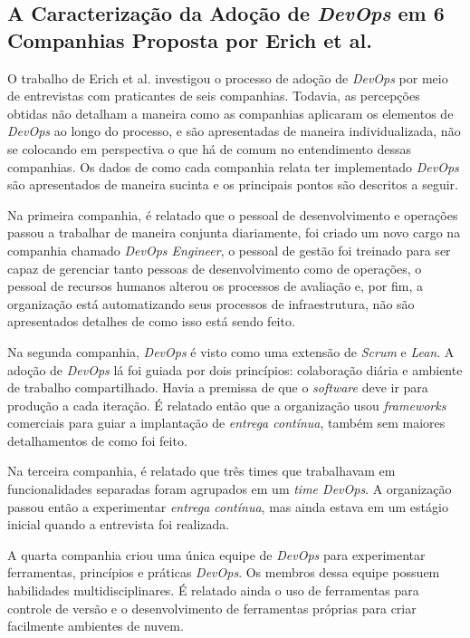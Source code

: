 {\subsection{A Caracterização da Adoção de {\it DevOps} em 6 Companhias Proposta por Erich et al. \cite{qualitative_devops_journalsw_17}}

O trabalho de Erich et al. \cite{qualitative_devops_journalsw_17} investigou
o processo de adoção de \textit{DevOps} por meio de entrevistas com praticantes
de seis companhias. Todavia, as percepções obtidas não detalham a maneira como
as companhias aplicaram os elementos de \textit{DevOps} ao longo do processo,
e são apresentadas de maneira individualizada, não se colocando em perspectiva
o que há de comum no entendimento dessas companhias. Os dados de como cada
companhia relata ter implementado \textit{DevOps} são apresentados de maneira
sucinta e os principais pontos são descritos a seguir.

Na primeira companhia, é relatado que o pessoal de desenvolvimento e
operações passou a trabalhar de maneira conjunta diariamente, foi criado um
novo cargo na companhia chamado \textit{DevOps Engineer}, o pessoal de gestão
foi treinado para ser capaz de gerenciar tanto pessoas de desenvolvimento como
de operações, o pessoal de recursos humanos alterou os processos de avaliação e,
por fim, a organização está automatizando seus processos de infraestrutura, não
são apresentados detalhes de como isso está sendo feito.

Na segunda companhia, \textit{DevOps} é visto como uma extensão de
\textit{Scrum} e \textit{Lean}. A adoção de \textit{DevOps} lá foi guiada por
dois princípios: colaboração diária e ambiente de trabalho compartilhado.
Havia a premissa de que o \textit{software} deve ir para produção a cada
iteração. É relatado então que a organização usou \textit{frameworks}
comerciais para guiar a implantação de \emph{entrega contínua}, também sem maiores
detalhamentos de como foi feito.

Na terceira companhia, é relatado que três times que trabalhavam em
funcionalidades separadas foram agrupados em um \emph{time DevOps}. A organização
passou então a experimentar \textit{entrega contínua}, mas ainda estava em
um estágio inicial quando a entrevista foi realizada.

A quarta companhia criou uma única equipe de \textit{DevOps} para
experimentar ferramentas, princípios e práticas \textit{DevOps}. Os
membros dessa equipe possuem habilidades multidisciplinares. É relatado ainda
o uso de ferramentas para controle de versão e o desenvolvimento de ferramentas
próprias para criar facilmente ambientes de nuvem.

}
